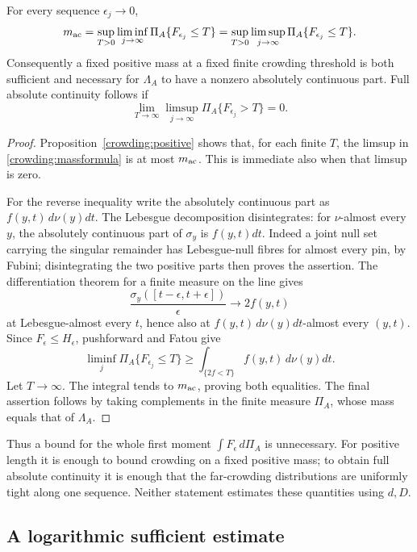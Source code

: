 \begin{proposition}\label{crowding:mass}
For every sequence \(\epsilon_j\to0\),
\begin{equation}\label{crowding:massformula}
 m_{\rm ac}
 =\sup_{T>0}\liminf_{j\to\infty}\Pi_A\{F_{\epsilon_j}\le T\}
 =\sup_{T>0}\limsup_{j\to\infty}\Pi_A\{F_{\epsilon_j}\le T\}.
\end{equation}
Consequently a fixed positive mass at a fixed finite crowding threshold is
both sufficient and necessary for \(\Lambda_A\) to have a nonzero
absolutely continuous part. Full absolute continuity follows if
\[
 \lim_{T\to\infty}\limsup_{j\to\infty}
       \Pi_A\{F_{\epsilon_j}>T\}=0.
\]
\end{proposition}

\begin{proof}
Proposition~\ref{crowding:positive} shows that, for each finite \(T\),
the limsup in \eqref{crowding:massformula} is at most \(m_{\rm ac}\).
This is immediate also when that limsup is zero.

For the reverse inequality write the absolutely continuous part as
\(f(y,t)\,d\nu(y)dt\). The Lebesgue decomposition disintegrates:
for \(\nu\)-almost every \(y\), the absolutely continuous part of
\(\sigma_y\) is \(f(y,t)dt\). Indeed a joint null set carrying the
singular remainder has Lebesgue-null fibres for almost every pin, by
Fubini; disintegrating the two positive parts then proves the assertion.
The differentiation theorem for a finite measure on the line gives
\[
 \frac{\sigma_y([t-\epsilon,t+\epsilon])}{\epsilon}
       \longrightarrow 2f(y,t)
\]
at Lebesgue-almost every \(t\), hence also at
\(f(y,t)\,d\nu(y)dt\)-almost every \((y,t)\).
Since \(F_\epsilon\le H_\epsilon\), pushforward and Fatou give
\[
 \liminf_j\Pi_A\{F_{\epsilon_j}\le T\}
 \ge\int_{\{2f<T\}} f(y,t)\,d\nu(y)dt.
\]
Let \(T\to\infty\). The integral tends to \(m_{\rm ac}\), proving
both equalities. The final assertion follows by taking complements in
the finite measure \(\Pi_A\), whose mass equals that of \(\Lambda_A\).
\end{proof}

Thus a bound for the whole first moment \(\int F_\epsilon\,d\Pi_A\)
is unnecessary. For positive length it is enough to bound crowding on a
fixed positive mass; to obtain full absolute continuity it is enough that
the far-crowding distributions are uniformly tight along one sequence.
Neither statement estimates these quantities using \(d,D\).

\subsection{A logarithmic sufficient estimate}

